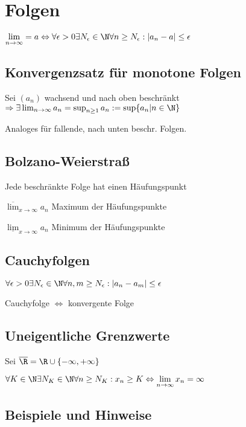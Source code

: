 \section*{Folgen}

$\displaystyle\lim_{n \to \infty} = a \Leftrightarrow \forall \epsilon > 0 \exists N_\epsilon \in \N \forall n \geq N_\epsilon : | a_n - a | \leq \epsilon$

\subsection*{Konvergenzsatz für monotone Folgen}

Sei $(a_n)$ wachsend und nach oben beschränkt \\ $\Rightarrow \exists \lim_{n \to \infty} a_n = \sup_{n\geq 1} a_n := \sup\{a_n | n \in \N\}$

Analoges für fallende, nach unten beschr. Folgen.

\subsection*{Bolzano-Weierstraß}

Jede beschränkte Folge hat einen Häufungspunkt

$\overline\lim_{x \to \infty} a_n$ Maximum der Häufungspunkte

$\underline\lim_{x \to \infty} a_n$ Minimum der Häufungspunkte

\subsection*{Cauchyfolgen}

$\forall \epsilon > 0 \exists N_\epsilon \in \N \forall n, m \geq N_\epsilon : | a_n - a_m | \leq \epsilon$

Cauchyfolge $\Leftrightarrow$ konvergente Folge

\subsection*{Uneigentliche Grenzwerte}

Sei $\overline{\R} = \R \cup \{-\infty, +\infty\}$

$\forall K \in \N \exists N_K \in \N \forall n \geq N_K : x_n \geq K \Leftrightarrow \displaystyle\lim_{n \to \infty} x_n = \infty$

\subsection*{Beispiele und Hinweise}

